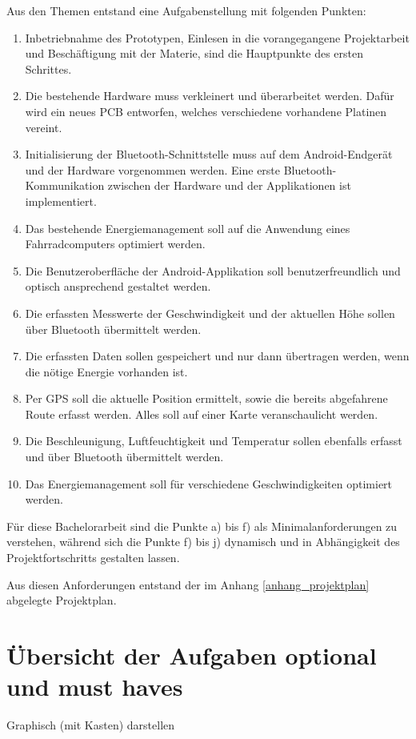 Aus den Themen entstand eine Aufgabenstellung mit folgenden Punkten:


\begin{enumerate} 

\item Inbetriebnahme des Prototypen, Einlesen in die vorangegangene Projektarbeit und Beschäftigung mit der Materie, sind die Hauptpunkte des ersten Schrittes.

\item Die bestehende Hardware muss verkleinert und überarbeitet werden. Dafür wird ein neues PCB entworfen, welches verschiedene vorhandene Platinen vereint.

\item Initialisierung der Bluetooth-Schnittstelle muss auf dem Android-Endgerät und der Hardware vorgenommen werden. Eine erste Bluetooth-Kommunikation zwischen der Hardware und der Applikationen ist implementiert.

\item Das bestehende Energiemanagement soll auf die Anwendung eines Fahrradcomputers optimiert werden.

\item Die Benutzeroberfläche der Android-Applikation soll benutzerfreundlich und optisch ansprechend gestaltet werden.

\item Die erfassten Messwerte der Geschwindigkeit und der aktuellen Höhe sollen über Bluetooth übermittelt werden.

\item	Die erfassten Daten sollen gespeichert und nur dann übertragen werden, wenn die nötige Energie vorhanden ist.

\item	Per GPS soll die aktuelle Position ermittelt, sowie die bereits abgefahrene Route erfasst werden. Alles soll auf einer Karte veranschaulicht werden.

\item	Die Beschleunigung, Luftfeuchtigkeit und Temperatur sollen ebenfalls erfasst und über Bluetooth übermittelt werden.


\item	Das Energiemanagement soll für verschiedene Geschwindigkeiten optimiert werden.
\end{enumerate}

Für diese Bachelorarbeit sind die Punkte a) bis f) als Minimalanforderungen zu verstehen, während sich die Punkte f) bis j) dynamisch und in Abhängigkeit des Projektfortschritts gestalten lassen.


Aus diesen Anforderungen entstand der im Anhang \ref{anhang_projektplan} abgelegte Projektplan. 






\section{Übersicht der Aufgaben optional und must haves}
Graphisch (mit Kasten) darstellen 

